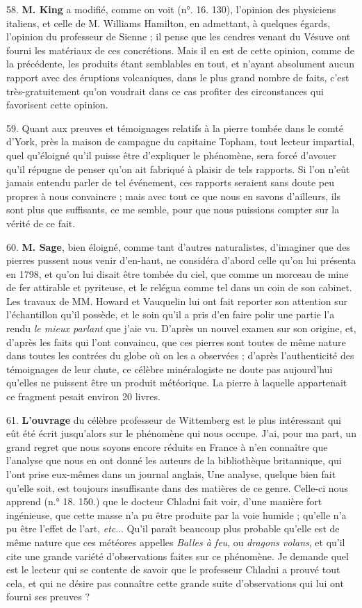 \documentclass[a4paper, 11pt, oneside, polutonikogreek, french]{article}
\begin{document}
58. \textbf{M. King} a modifié, comme on voit (n°. 16. 130), l'opinion des physiciens italiens, et celle de M. Williams Hamilton, en admettant, à quelques égards, l'opinion du professeur de Sienne ; il pense que les cendres venant du Vésuve ont fourni les matériaux de ces concrétions. Mais il en est de cette opinion, comme de la précédente, les produits étant semblables en tout, et n'ayant absolument aucun rapport avec des éruptions volcaniques, dans le plus grand nombre de faits, c'est très-gratuitement qu'on voudrait dans ce cas profiter des circonstances qui favorisent cette opinion.

59. Quant aux preuves et témoignages relatifs à la pierre tombée dans le comté d'York, près la maison de campagne du capitaine Topham, tout lecteur impartial, quel qu’éloigné qu'il puisse être d'expliquer le phénomène, sera forcé d'avouer qu'il répugne de penser qu'on ait fabriqué à plaisir de tels rapports. Si l'on n'eût jamais entendu parler de tel événement, ces rapports seraient sans doute peu propres à nous convaincre ; mais avec tout ce que nous en savons d'ailleurs, ils sont plus que suffisants, ce me semble, pour que nous puissions compter sur la vérité de ce fait.

60. \textbf{M. Sage}, bien éloigné, comme tant d'autres naturalistes, d'imaginer que des pierres pussent nous venir d'en-haut, ne considéra d'abord celle qu'on lui présenta en 1798, et qu'on lui disait être tombée du ciel, que comme un morceau de mine de fer attirable et pyriteuse, et le relégua comme tel dans un coin de son cabinet. Les travaux de MM. Howard et Vauquelin lui ont fait reporter son attention sur l'échantillon qu'il possède, et le soin qu'il a pris d'en faire polir une partie l'a rendu \emph{le mieux parlant} que j'aie vu. D'après un nouvel examen sur son origine, et, d'après les faits qui l'ont convaincu, que ces pierres sont toutes de même nature dans toutes les contrées du globe où on les a observées ; d'après l'authenticité des témoignages de leur chute, ce célèbre minéralogiste ne doute pas aujourd'hui qu'elles ne puissent être un produit météorique. La pierre à laquelle appartenait ce fragment pesait environ 20 livres.

61. \textbf{L'ouvrage} du célèbre professeur de Wittemberg est le plus intéressant qui eût été écrit jusqu'alors sur le phénomène qui nous occupe. J'ai, pour ma part, un grand regret que nous soyons encore réduits en France à n'en connaître que l'analyse que nous en ont donné les auteurs de la bibliothèque britannique, qui l'ont prise eux-mêmes dans un journal anglais, Une analyse, quelque bien fait qu'elle soit, est toujours insuffisante dans des matières de ce genre. Celle-ci nous apprend (n.° 18. 150.) que le docteur Chladni fait voir, d'une manière fort ingénieuse, que cette masse n'a pu être produite par la voie humide ; qu'elle n'a pu être l'effet de l'art, \emph{etc}... Qu'il paraît beaucoup plus probable qu'elle est de même nature que ces météores appelles \emph{Balles à feu}, ou \emph{dragons volans}, et qu'il cite une grande variété d'observations faites sur ce phénomène. Je demande quel est le lecteur qui se contente de savoir que le professeur Chladni a prouvé tout cela, et qui ne désire pas connaître cette grande suite d'observations qui lui ont fourni ses preuves ?
\end{document}
